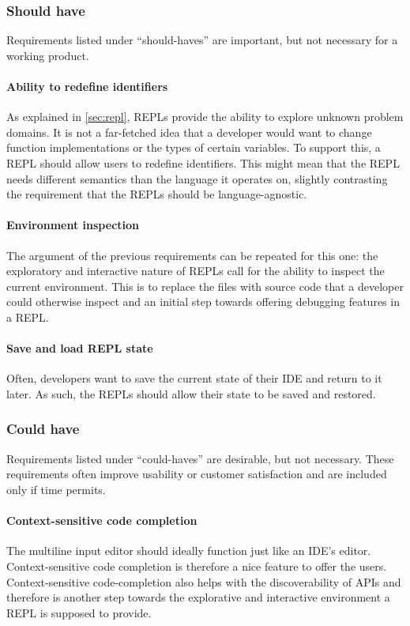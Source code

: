 \subsubsection{Should have}

Requirements listed under ``should-haves'' are important, but not necessary for
a working product.

\paragraph{Ability to redefine identifiers} As explained in \cref{sec:repl},
REPLs provide the ability to explore unknown problem domains. It is not a
far-fetched idea that a developer would want to change function implementations
or the types of certain variables. To support this, a REPL should allow users to
redefine identifiers. This might mean that the REPL needs different semantics
than the language it operates on, slightly contrasting the requirement that the
REPLs should be language-agnostic.

\paragraph{Environment inspection} The argument of the previous requirements can
be repeated for this one: the exploratory and interactive nature of REPLs call
for the ability to inspect the current environment. This is to replace the files
with source code that a developer could otherwise inspect and an initial step
towards offering debugging features in a REPL.

\paragraph{Save and load REPL state} Often, developers want to save the current
state of their IDE and return to it later. As such, the REPLs should allow their
state to be saved and restored.

\subsubsection{Could have}

Requirements listed under ``could-haves'' are desirable, but not necessary.
These requirements often improve usability or customer satisfaction and are
included only if time permits.

\paragraph{Context-sensitive code completion} The multiline input editor should
ideally function just like an IDE's editor. Context-sensitive code completion is
therefore a nice feature to offer the users. Context-sensitive code-completion
also helps with the discoverability of APIs and therefore is another step
towards the explorative and interactive environment a REPL is supposed to
provide.

